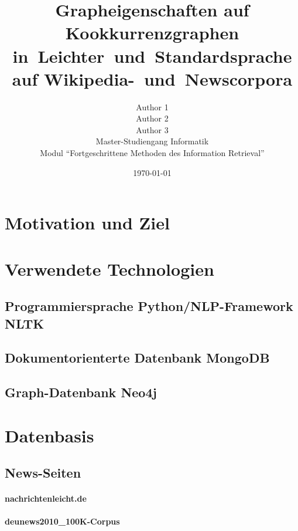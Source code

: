 \documentclass[12pt]{article}
\title{Grapheigenschaften auf Kookkurrenzgraphen in~Leichter~und~Standardsprache auf Wikipedia-~und~Newscorpora}
\author{Author 1\\Author 2\\Author 3\\Master-Studiengang  Informatik\\Modul "`Fortgeschrittene Methoden des Information Retrieval"'}
\date{\today}
\begin{document}
\maketitle


\section{Motivation und Ziel}



\section{Verwendete Technologien}
\subsection{Programmiersprache Python/NLP-Framework NLTK}



\subsection{Dokumentorienterte Datenbank MongoDB}



\subsection{Graph-Datenbank Neo4j}



\section{Datenbasis}
\subsection{News-Seiten}
\paragraph{nachrichtenleicht.de}

\paragraph{deunews2010\_100K-Corpus}
\end{document}
